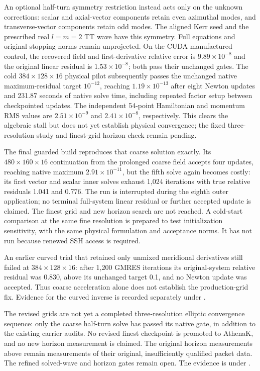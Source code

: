 \documentclass[aps,prd,preprint,notitlepage,nofootinbib]{revtex4-2}
\begin{document}
An optional half-turn symmetry restriction instead acts only on the
unknown corrections: scalar and axial-vector components retain even
azimuthal modes, and transverse-vector components retain odd modes.
The aligned Kerr seed and the prescribed real $l=m=2$ TT wave have this
symmetry. Full equations and original stopping norms remain unprojected.
On the CUDA manufactured control, the recovered field and first-derivative
relative error is $9.89\times10^{-8}$ and the original linear residual is
$1.53\times10^{-8}$; both pass their unchanged gates. The cold
$384\times128\times16$ physical pilot subsequently passes the unchanged
native maximum-residual target $10^{-12}$, reaching
$1.19\times10^{-13}$ after eight Newton updates and 231.87 seconds of
native solve time, including repeated factor setup between checkpointed
updates. The independent 54-point Hamiltonian and momentum RMS values are
$2.51\times10^{-9}$ and $2.41\times10^{-8}$, respectively. This clears the
algebraic stall but does not yet establish physical convergence; the fixed
three-resolution study and finest-grid horizon check remain pending.

The final guarded build reproduces that coarse solution exactly. Its
$480\times160\times16$ continuation from the prolonged coarse field
accepts four updates, reaching native maximum $2.91\times10^{-11}$,
but the fifth solve again becomes costly: its first vector and scalar
inner solves exhaust 1,024 iterations with true relative residuals
1.041 and 0.776. The run is interrupted during the eighth outer
application; no terminal full-system linear residual or further accepted
update is claimed. The finest grid and new horizon search are not reached.
A cold-start comparison at the same fine resolution is prepared to test
initialization sensitivity, with the same physical formulation and
acceptance norms. It has not run because renewed SSH access is required.

An earlier curved trial that retained only unmixed meridional derivatives
still failed at $384\times128\times16$: after 1,200 GMRES iterations
its original-system relative residual was 0.830, above its unchanged
target 0.1, and no Newton update was accepted. Thus coarse acceleration
alone does not establish the production-grid fix. Evidence for the
curved inverse is recorded separately under
.

The revised grids are not yet a completed three-resolution elliptic
convergence sequence: only the coarse half-turn solve has passed its native
gate, in addition to the existing carrier audits.
No revised finest checkpoint is promoted to AthenaK, and no new horizon
measurement is claimed. The original horizon measurements above remain
measurements of their original, insufficiently qualified packet data.
The refined solved-wave and horizon gates remain open. The evidence is
under .
\end{document}
